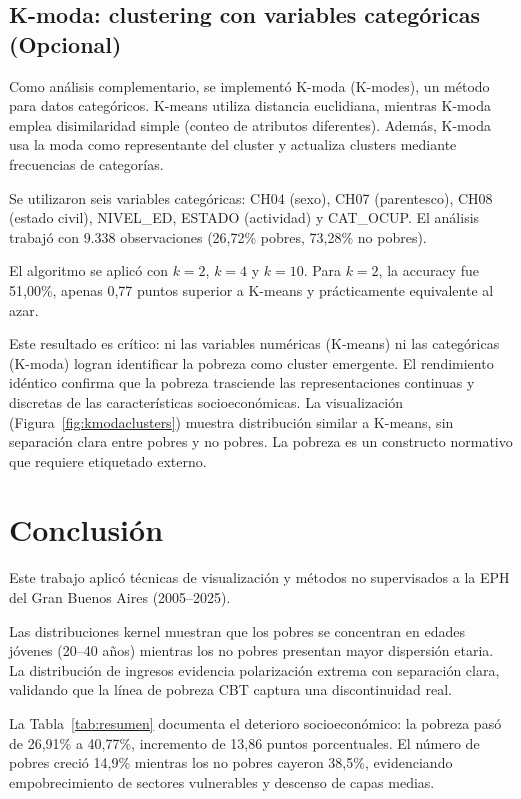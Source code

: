 \documentclass[11pt,a4paper]{article}
\begin{document}
\subsection{K-moda: clustering con variables categóricas (Opcional)}

Como análisis complementario, se implementó K-moda (K-modes), un método para datos categóricos. K-means utiliza distancia euclidiana, mientras K-moda emplea disimilaridad simple (conteo de atributos diferentes). Además, K-moda usa la moda como representante del cluster y actualiza clusters mediante frecuencias de categorías.

Se utilizaron seis variables categóricas: CH04 (sexo), CH07 (parentesco), CH08 (estado civil), NIVEL\_ED, ESTADO (actividad) y CAT\_OCUP. El análisis trabajó con 9.338 observaciones (26,72\% pobres, 73,28\% no pobres).

El algoritmo se aplicó con $k=2$, $k=4$ y $k=10$. Para $k=2$, la accuracy fue 51,00\%, apenas 0,77 puntos superior a K-means y prácticamente equivalente al azar.

Este resultado es crítico: ni las variables numéricas (K-means) ni las categóricas (K-moda) logran identificar la pobreza como cluster emergente. El rendimiento idéntico confirma que la pobreza trasciende las representaciones continuas y discretas de las características socioeconómicas. La visualización (Figura~\ref{fig:kmodaclusters}) muestra distribución similar a K-means, sin separación clara entre pobres y no pobres. La pobreza es un constructo normativo que requiere etiquetado externo.

\section{Conclusión}

Este trabajo aplicó técnicas de visualización y métodos no supervisados a la EPH del Gran Buenos Aires (2005--2025).

Las distribuciones kernel muestran que los pobres se concentran en edades jóvenes (20--40 años) mientras los no pobres presentan mayor dispersión etaria. La distribución de ingresos evidencia polarización extrema con separación clara, validando que la línea de pobreza CBT captura una discontinuidad real.

La Tabla~\ref{tab:resumen} documenta el deterioro socioeconómico: la pobreza pasó de 26,91\% a 40,77\%, incremento de 13,86 puntos porcentuales. El número de pobres creció 14,9\% mientras los no pobres cayeron 38,5\%, evidenciando empobrecimiento de sectores vulnerables y descenso de capas medias.
\end{document}

